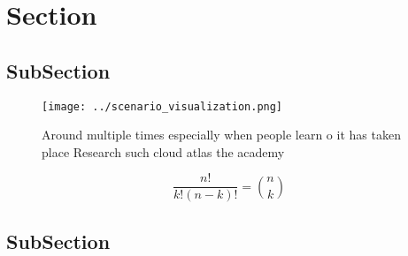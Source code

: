 \documentclass[a4paper]{article}
\begin{document}
\section{Section}

\subsection{SubSection}

\begin{figure}
\centering
\texttt{[image: ../scenario\_visualization.png]}
\caption{Around multiple times especially when people learn o it has taken place Research such cloud atlas the academy
}
\end{figure}
 
\[ \frac{n!}{k!(n-k)!} = \binom{n}{k} \]

\subsection{SubSection}
\end{document}
